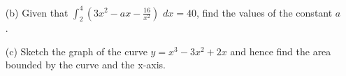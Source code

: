 \begin{enumerate}
\begin{enumerate}[topsep=0ex,itemsep=0ex,partopsep=1ex,parsep=1ex]
		\item[(b)] Given that $\int_2^4 \left(3x^2 - ax - \frac{16}{x^2}\right)$ $dx = 40$, find the values of the constant $a$. 
		
		\item[(c)] Sketch the graph of the curve $y = x^3 - 3x^2 + 2x$ and hence find the area bounded by the curve and the x-axis. 
	\end{enumerate}

\end{enumerate}












